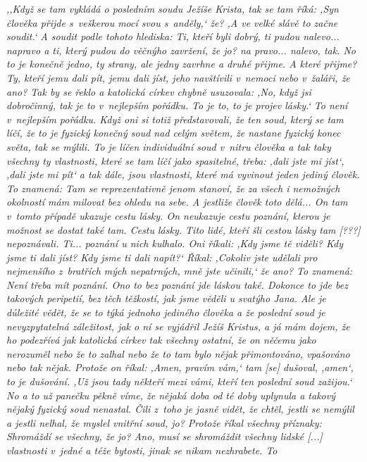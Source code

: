 \begin{enumerate}
{%
\textit{%
,,Když se tam vykládá o posledním soudu Ježíše Krista, tak se tam říká: ,Syn
člověka přijde s~veškerou mocí svou s~anděly,` že? ,A ve velké slávě to začne
soudit.` A soudit podle tohoto hlediska: Ti, kteří byli dobrý, ti pudou
nalevo... napravo a ti, který pudou do věčnýho zavržení, že jo? na pravo...
nalevo, tak. No to je konečně jedno, ty strany, ale jedny zavrhne a druhé
přijme. A které přijme? Ty, kteří jemu dali pít, jemu dali jíst, jeho navštívili
v~nemoci nebo v~žaláři, že ano? Tak by se řeklo a katolická církev chybně
usuzovala: ,No, když jsi dobročinný, tak je to v~nejlepším pořádku. To je to, to
je projev lásky.` To není v~nejlepším pořádku. Když oni si totiž představovali,
že ten soud, který se tam líčí, že to je fyzický konečný soud nad celým světem,
že nastane fyzický konec světa, tak se mýlili. To je líčen individuální soud
v~nitru člověka a tak taky všechny ty vlastnosti, které se tam líčí jako
spasitelné, třeba: ,dali jste mi jíst`, ,dali jste mi pít` a tak dále, jsou
vlastnosti, které má vyvinout jeden jediný člověk. To znamená: Tam se
reprezentativně jenom stanoví, že za všech i nemožných okolností mám milovat bez
ohledu na sebe. A jestliže člověk toto dělá... On tam v~tomto případě ukazuje
cestu lásky. On neukazuje cestu poznání, kterou je možnost se dostat také tam.
Cestu lásky. Tito lidé, kteří šli cestou lásky tam [???] nepoznávali. Ti...
poznání u nich kulhalo. Oni říkali: ,Kdy jsme tě viděli? Kdy jsme ti dali jíst?
Kdy jsme ti dali napít?{}` Říkal: ,Cokoliv jste udělali pro nejmenšího z~bratřích
mých nepatrných, mně jste učinili,` že ano? To znamená: Není třeba mít poznání.
Ono to bez poznání jde láskou také. Dokonce to jde bez takových peripetií, bez
těch těžkostí, jak jsme věděli u svatýho Jana. Ale je důležité vědět, že se to
týká jednoho jediného člověka a že poslední soud je nevyzpytatelná záležitost,
jak o ní se vyjádřil Ježíš Kristus, a já mám dojem, že ho podezřívá jak
katolická církev tak všechny ostatní, že on něčemu jako nerozuměl nebo že to
zalhal nebo že to tam bylo nějak přimontováno, vpašováno nebo tak nějak. Protože
on říkal: ,Amen, pravím vám,` tam [se] dušoval, ,amen`, to je dušování. ,Už jsou
tady někteří mezi vámi, kteří ten poslední soud zažijou.` No a to už panečku
pěkně víme, že nějaká doba od té doby uplynula a takový nějaký fyzický soud
nenastal. Čili z~toho je jasně vidět, že chtěl, jestli se nemýlil a jestli
nelhal, že myslel vnitřní soud, jo? Protože říkal všechny příznaky: Shromáždí se
všechny, že jo? Ano, musí se shromáždit všechny lidské [...]
vlastnosti v~jedné a téže bytosti, jinak se nikam nezhrabete. To
}}
\end{enumerate}
